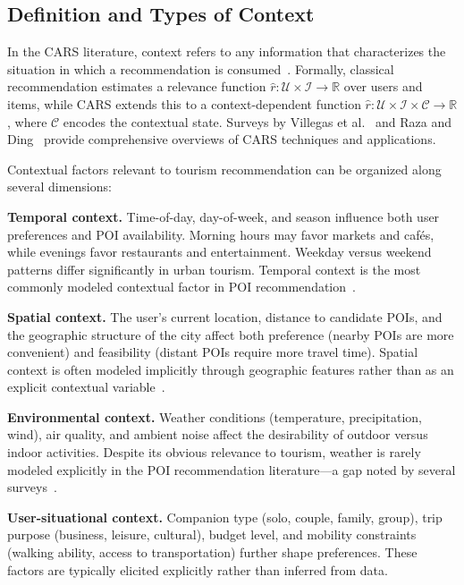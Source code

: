 \subsection{Definition and Types of Context}
\label{sec:sota-cars-def}

In the CARS literature, context refers to any information that characterizes the situation in which a recommendation is consumed~\cite{adomavicius2005cars, adomavicius2022cars}. Formally, classical recommendation estimates a relevance function $\hat{r}: \mathcal{U} \times \mathcal{I} \to \mathbb{R}$ over users and items, while CARS extends this to a context-dependent function $\hat{r}: \mathcal{U} \times \mathcal{I} \times \mathcal{C} \to \mathbb{R}$, where $\mathcal{C}$ encodes the contextual state. Surveys by Villegas et al.~\cite{villegas2018cars} and Raza and Ding~\cite{raza2019cars} provide comprehensive overviews of CARS techniques and applications.

Contextual factors relevant to tourism recommendation can be organized along several dimensions:

\textbf{Temporal context.} Time-of-day, day-of-week, and season influence both user preferences and POI availability. Morning hours may favor markets and cafés, while evenings favor restaurants and entertainment. Weekday versus weekend patterns differ significantly in urban tourism. Temporal context is the most commonly modeled contextual factor in POI recommendation~\cite{zhao2016stellar, zhang2014timepoi}.

\textbf{Spatial context.} The user's current location, distance to candidate POIs, and the geographic structure of the city affect both preference (nearby POIs are more convenient) and feasibility (distant POIs require more travel time). Spatial context is often modeled implicitly through geographic features rather than as an explicit contextual variable~\cite{ye2011geo}.

\textbf{Environmental context.} Weather conditions (temperature, precipitation, wind), air quality, and ambient noise affect the desirability of outdoor versus indoor activities. Despite its obvious relevance to tourism, weather is rarely modeled explicitly in the POI recommendation literature---a gap noted by several surveys~\cite{villegas2018cars, mateos2025carsslr}.

\textbf{User-situational context.} Companion type (solo, couple, family, group), trip purpose (business, leisure, cultural), budget level, and mobility constraints (walking ability, access to transportation) further shape preferences. These factors are typically elicited explicitly rather than inferred from data.

